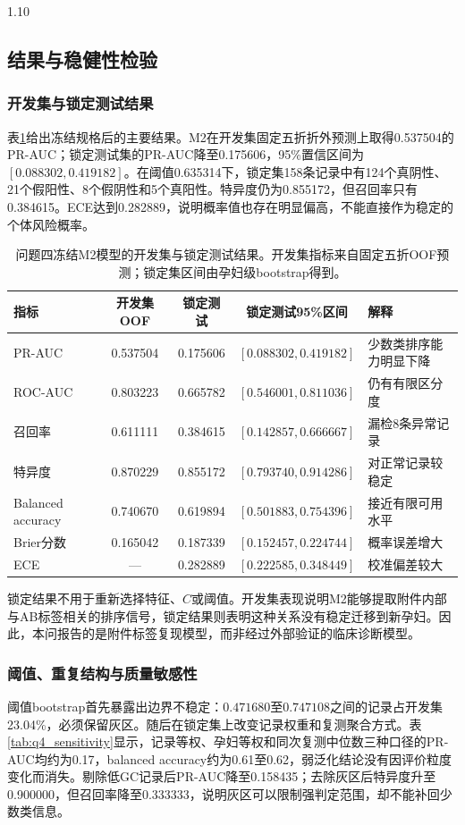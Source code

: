 \documentclass[12pt,a4paper]{ctexrep}
\numberwithin{equation}{section}
\begin{document}
\begin{spacing}{1.10}
{			\subsection{结果与稳健性检验}
			\subsubsection{开发集与锁定测试结果}
			表\ref{tab:q4_main_results}给出冻结规格后的主要结果。M2在开发集固定五折折外预测上取得0.537504的PR-AUC；锁定测试集的PR-AUC降至0.175606，95\%置信区间为$[0.088302,0.419182]$。在阈值0.635314下，锁定集158条记录中有124个真阴性、21个假阳性、8个假阴性和5个真阳性。特异度仍为0.855172，但召回率只有0.384615。ECE达到0.282889，说明概率值也存在明显偏高，不能直接作为稳定的个体风险概率。

			\begin{table}[H]
			\centering
			\footnotesize
			\renewcommand{\arraystretch}{1.15}
			\caption{问题四冻结M2模型的开发集与锁定测试结果。开发集指标来自固定五折OOF预测；锁定集区间由孕妇级bootstrap得到。}
			\label{tab:q4_main_results}
			\begin{tabularx}{\textwidth}{@{}lcccX@{}}
			\toprule
			指标 & 开发集OOF & 锁定测试 & 锁定测试95\%区间 & 解释 \\
			\midrule
			PR-AUC & 0.537504 & 0.175606 & $[0.088302,0.419182]$ & 少数类排序能力明显下降 \\
			ROC-AUC & 0.803223 & 0.665782 & $[0.546001,0.811036]$ & 仍有有限区分度 \\
			召回率 & 0.611111 & 0.384615 & $[0.142857,0.666667]$ & 漏检8条异常记录 \\
			特异度 & 0.870229 & 0.855172 & $[0.793740,0.914286]$ & 对正常记录较稳定 \\
			Balanced accuracy & 0.740670 & 0.619894 & $[0.501883,0.754396]$ & 接近有限可用水平 \\
			Brier分数 & 0.165042 & 0.187339 & $[0.152457,0.224744]$ & 概率误差增大 \\
			ECE & --- & 0.282889 & $[0.222585,0.348449]$ & 校准偏差较大 \\
			\bottomrule
			\end{tabularx}
			\end{table}

			锁定结果不用于重新选择特征、$C$或阈值。开发集表现说明M2能够提取附件内部与AB标签相关的排序信号，锁定结果则表明这种关系没有稳定迁移到新孕妇。因此，本问报告的是附件标签复现模型，而非经过外部验证的临床诊断模型。

			\subsubsection{阈值、重复结构与质量敏感性}
			阈值bootstrap首先暴露出边界不稳定：$0.471680$至$0.747108$之间的记录占开发集23.04\%，必须保留灰区。随后在锁定集上改变记录权重和复测聚合方式。表\ref{tab:q4_sensitivity}显示，记录等权、孕妇等权和同次复测中位数三种口径的PR-AUC均约为0.17，balanced accuracy约为0.61至0.62，弱泛化结论没有因评价粒度变化而消失。剔除低GC记录后PR-AUC降至0.158435；去除灰区后特异度升至0.900000，但召回率降至0.333333，说明灰区可以限制强判定范围，却不能补回少数类信息。

}
\end{spacing}
\end{document}
